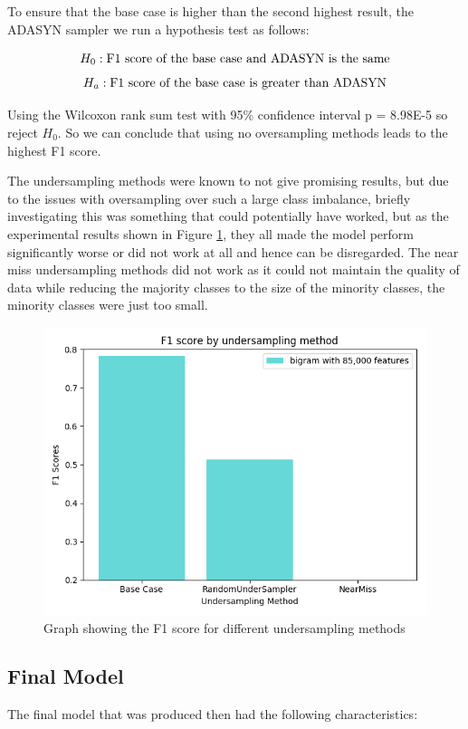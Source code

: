 To ensure that the base case is higher than the second highest result, the ADASYN sampler we run a hypothesis test as follows:

$$ H_0: \textnormal{F1 score of the base case and ADASYN is the same} $$
$$ H_a: \textnormal{F1 score of the base case is greater than ADASYN} $$

Using the Wilcoxon rank sum test with 95\% confidence interval p = 8.98E-5 so reject $H_0$. So we can conclude that using no oversampling methods leads to the highest F1 score.


The undersampling methods were known to not give promising results, but due to the issues with oversampling over such a large class imbalance, briefly investigating this was something that could potentially have worked, but as the experimental results shown in Figure \ref{undersamplegraph}, they all made the model perform significantly worse or did not work at all and hence can be disregarded. The near miss undersampling methods did not work as it could not maintain the quality of data while reducing the majority classes to the size of the minority classes, the minority classes were just too small.

\begin{figure}[ht]
\centering
\includegraphics[scale=0.6]{graphs/undersampleNB.png}
\caption{Graph showing the F1 score for different undersampling methods}
\label{undersamplegraph}
\end{figure}

\subsection{Final Model}
\label{finalModelSection}
The final model that was produced then had the following characteristics: 


